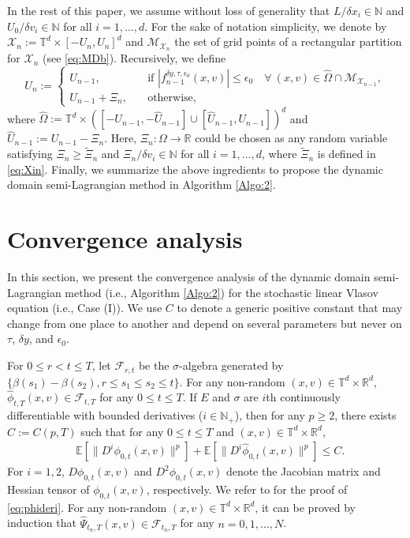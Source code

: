 \documentclass[11pt,reqno]{amsproc}
\newcommand{\R}{\mathbb{R}}
\numberwithin{equation}{section}
\newcommand{\E}{\mathbb{E}}\allowdisplaybreaks[4]
\begin{document}
In the rest of this paper, we assume without loss of generality that $L/\delta x_i\in\mathbb{N}$ and $U_0/\delta v_i\in\mathbb{N}$ for all $i=1,\ldots,d$. For the sake of notation simplicity, we denote by $\mathscr{X}_n:=\mathbb{T}^d\times[-U_n,U_n]^d$ and $\mathcal{M}_{\mathscr{X}_n}$ the set of grid points of a rectangular
 partition for $\mathscr{X}_n$ (see \eqref{eq:MDb}).
Recursively, we define 
\begin{equation}\label{eq:Un}
 U_{n}:=\begin{cases}
 U_{n-1}, \quad & \text{if } |f^{\delta y,\tau,\epsilon_0}_{n-1}(x,v)|\le \epsilon_0 
 \quad \forall~(x,v)\in \hat{\Omega} \cap \mathcal{M}_{\mathscr X_{n-1}}, \\
 U_{n-1}+\Xi_{n}, \quad &\text{otherwise},
 \end{cases}
\end{equation}
where 
$\hat{\Omega} := \mathbb{T}^d\times([-U_{n-1},-\hat{U}_{n-1}]\cup[\hat{U}_{n-1},U_{n-1}])^d$ and $\hat{U}_{n-1}:=U_{n-1}-\Xi_{n}$. Here, 
$\Xi_{n}:\Omega\to\R$ could be chosen as any random variable 
satisfying $\Xi_{n}\ge\widetilde\Xi_n$ and $\Xi_{n}/\delta v_i\in\mathbb{N}$ for all $i=1,\ldots,d$, where
$\widetilde\Xi_n$ is defined in \eqref{eq:Xin}.
Finally, we summarize the above ingredients to propose the dynamic domain semi-Lagrangian method in 
Algorithm \ref{Algo:2}.



\section{Convergence analysis}\label{S4}

In this section, we present the convergence analysis of the dynamic domain semi-Lagrangian method (i.e., Algorithm \ref{Algo:2}) for the stochastic linear Vlasov equation (i.e., Case (I)). We use $C$ to denote a generic positive constant that may change from one place to another and depend on several parameters but never on $\tau$, $\delta y$, and $\epsilon_0$.

For $0\le r<t\le T$, let $\mathscr{F}_{r,t}$ be the $\sigma$-algebra generated by $\{\beta(s_1)-\beta(s_2),r\le s_1\le s_2\le t\}$.
For any non-random $(x,v)\in\mathbb{T}^d\times \R^{d}$,
$\widehat{\phi}_{t,T}(x,v)\in\mathscr{F}_{t,T}$ for any $0\le t\le T$.
If $E$ and $\sigma$ are $i$th continuously differentiable with bounded derivatives ($i\in\mathbb{N}_+$), then for any $p\ge2$, there exists $C:=C(p,T)$ such that for any $0\le t\le T$ and $(x,v)\in\mathbb{T}^d\times \R^{d}$,
\begin{align}\label{eq:phideri}
&\E\left[\|D^i\phi_{0,t}(x,v)\|^p\right]+\E\left[\|D^i\widehat{\phi}_{0,t}(x,v)\|^p\right]\le C.
\end{align}
For $i=1,2$, $D\phi_{0,t}(x,v)$ and $D^2\phi_{0,t}(x,v)$ denote the Jacobian matrix and Hessian tensor of $\phi_{0,t}(x,v)$, respectively.
We refer to \cite[Theorem 3.4.4]{KH19} for the proof of \eqref{eq:phideri}.
For any non-random $(x,v)\in\mathbb{T}^d\times \R^{d}$, it can be proved by induction that
$\widehat{\Psi}_{t_n,T}(x,v)\in\mathscr{F}_{t_n,T}$ for any $n=0,1,\ldots,N$.
\end{document}
